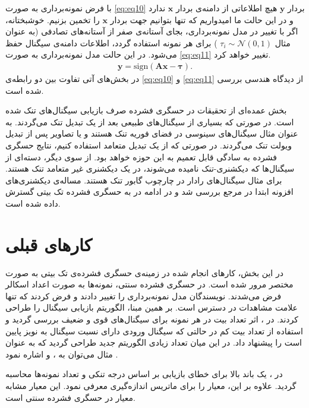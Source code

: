 با فرض نمونه‌برداری به صورت
\eqref{eq:eq10}
بردار
$\bm{y}$
هیچ اطلاعاتی از دامنه‌ی بردار
$\bm{x}$
ندارد و در این حالت ما امیدواریم که تنها بتوانیم جهت بردار 
$\bm{x}$
را تخمین بزنیم. خوشبختانه، اگر با تغییر در مدل نمونه‌برداری، بجای آستانه‌ی صفر از آستانه‌های تصادفی (به عنوان مثال 
$\tau_{i} \sim \mathcal{N}(0,1)$
) برای هر نمونه استفاده گردد، اطلاعات دامنه‌ی سیگنال حفظ می‌شود. در این حالت مدل نمونه‌برداری به صورت 
\eqref{eq:eq11}
تغییر خواهد کرد.
\begin{align}
\label{eq:eq11}
\bm{y}= \text{sign}\left(\bm{A}\bm{x}-\bm{\tau}\right).
\end{align}
در بخش‌های آتی تفاوت بین دو رابطه‌ی 
\eqref{eq:eq10}
و  
\eqref{eq:eq11}
از دیدگاه هندسی بررسی شده است.


بخش عمده‌ای از تحقیقات در حسگری فشرده صرف بازیابی سیگنال‌های تنک شده است. در صورتی که بسیاری از سیگنال‌های طبیعی بعد از یک تبدیل تنک می‌گردند. به عنوان مثال سیگنال‌های سینوسی در فضای فوریه تنک هستند و یا تصاویر پس از تبدیل ویولت
تنک می‌گردند. در صورتی که از یک تبدیل متعامد استفاده کنیم، نتایج حسگری فشرده به سادگی قابل تعمیم به این حوزه خواهد بود. از سوی دیگر، دسته‌ای از سیگنال‌ها که دیکشنری-تنک نامیده می‌شوند، در یک دیکشنری غیر متعامد تنک هستند. برای مثال  سیگنال‌های رادار در چارچوب گابور
تنک هستند. مساله‌ی دیکشنری‌های افزونه
ابتدا در مرجع 
\cite{Candes2011}
بررسی شد و در ادامه در
\cite{Baraniuk2017}
به حسگری فشرده تک بیتی گسترش داده شده است.

\section{کار‌های قبلی}
در این بخش، کارهای انجام شده در زمینه‌ی حسگری فشرده‌ی تک بیتی به صورت مختصر مرور شده است.
در حسگری فشرده سنتی، نمونه‌ها به صورت اعداد اسکالر فرض می‌شدند. نویسندگان
\cite{boufounos20081}
مدل نمونه‌برداری را تغییر دادند و فرض کردند که تنها علامت مشاهدات در دسترس است. بر همین مبنا، الگوریتم بازیابی سیگنال را طراحی کردند. در 
\cite{laska2012regime}،
اثر تعداد بیت در هر نمونه برای سیگنال‌های قوی و ضعیف بررسی گردید و  استفاده از تعداد بیت کم در حالتی که سیگنال ورودی دارای نسبت سیگنال به نویز پایین است را پیشنهاد داد. در این میان تعداد زیادی الگوریتم جدید طراحی گردید که به عنوان مثال می‌توان به 
،
و
اشاره نمود
\cite{boufounos2009greedy,laska2011trust,jacques2013robust}.


در  
\cite{jacques2013robust}،
یک باند بالا برای خطای بازیابی بر اساس درجه تنکی و تعداد نمونه‌ها محاسبه گردید. 	علاوه بر این، معیار 
را برای ماتریس اندازه‌گیری معرفی نمود. این معیار مشابه معیار 
در حسگری فشرده سنتی است. 

